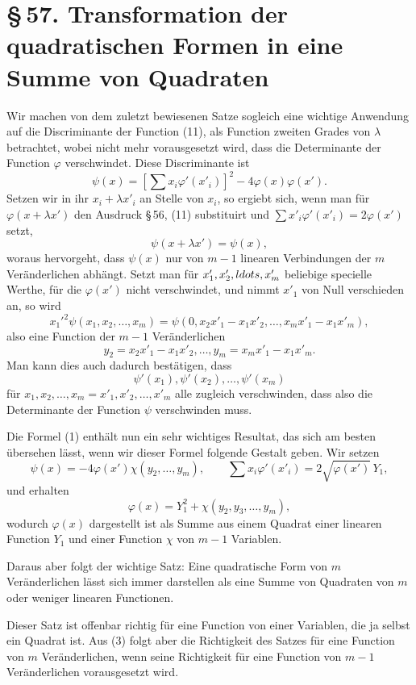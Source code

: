 \documentclass[11pt]{article}
\newcommand{\sect}[2]{\section*{\S\,#1. #2}}
\begin{document}
\sect{57}{Transformation der quadratischen Formen in eine Summe von Quadraten}

Wir machen von dem zuletzt bewiesenen Satze sogleich eine wichtige Anwendung auf die Discriminante der Function (11), als Function zweiten Grades von $\lambda$ betrachtet, wobei nicht mehr vorausgesetzt wird, dass die Determinante der Function $\varphi$ verschwindet. Diese Discriminante ist
\begin{equation}
 \psi(x)=\left[\sum x_i\varphi'(x'_i)\right]^2-4\varphi(x)\varphi(x').
\tag{1}
\end{equation}
Setzen wir in ihr $x_i+\lambda x'_i$ an Stelle von $x_i$, so ergiebt sich, wenn man für $\varphi(x+\lambda x')$ den Ausdruck \S\,56, (11) substituirt und $\sum x'_i\varphi'(x'_i)=2\varphi(x')$ setzt,
\[
 \psi(x+\lambda x')=\psi(x),
\]
woraus hervorgeht, dass $\psi(x)$ nur von $m-1$ linearen Verbindungen der $m$ Veränderlichen abhängt. Setzt man für $x'_1,x'_2,\\ldots,x'_m$ beliebige specielle Werthe, für die $\varphi(x')$ nicht verschwindet, und nimmt $x'_1$ von Null verschieden an, so wird
\[
 x_1'^2\psi(x_1,x_2,\ldots,x_m)=
 \psi(0,x_2x'_1-x_1x'_2,\ldots,x_mx'_1-x_1x'_m),
\]
also eine Function der $m-1$ Veränderlichen
\[
 y_2=x_2x'_1-x_1x'_2,
 \ldots,
 y_m=x_mx'_1-x_1x'_m.
\]
Man kann dies auch dadurch bestätigen, dass
\[
 \psi'(x_1),\psi'(x_2),\ldots,\psi'(x_m)
\]
für $x_1,x_2,\ldots,x_m=x'_1,x'_2,\ldots,x'_m$ alle zugleich verschwinden, dass also die Determinante der Function $\psi$ verschwinden muss.

Die Formel (1) enthält nun ein sehr wichtiges Resultat, das sich am besten übersehen lässt, wenn wir dieser Formel folgende Gestalt geben. Wir setzen
\begin{equation}
 \psi(x)=-4\varphi(x')\chi(y_2,\ldots,y_m),
 \qquad
 \sum x_i\varphi'(x'_i)=2\sqrt{\varphi(x')}\,Y_1,
\tag{2}
\end{equation}
und erhalten
\begin{equation}
 \varphi(x)=Y_1^2+\chi(y_2,y_3,\ldots,y_m),
\tag{3}
\end{equation}
wodurch $\varphi(x)$ dargestellt ist als Summe aus einem Quadrat einer linearen Function $Y_1$ und einer Function $\chi$ von $m-1$ Variablen.

Daraus aber folgt der wichtige Satz: Eine quadratische Form von $m$ Veränderlichen lässt sich immer darstellen als eine Summe von Quadraten von $m$ oder weniger linearen Functionen.

Dieser Satz ist offenbar richtig für eine Function von einer Variablen, die ja selbst ein Quadrat ist. Aus (3) folgt aber die Richtigkeit des Satzes für eine Function von $m$ Veränderlichen, wenn seine Richtigkeit für eine Function von $m-1$ Veränderlichen vorausgesetzt wird.
\end{document}
